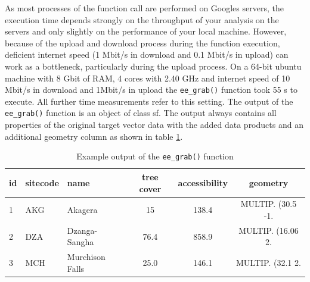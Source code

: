 As most processes of the function call are performed on Googles servers, the execution time depends strongly on the throughput of your analysis on the servers and only slightly on the performance of your local machine. However, because of the upload and download process during the function execution, deficient internet speed (1 Mbit/s in download and 0.1 Mbit/s in upload) can work as a bottleneck, particularly during the upload process. 
On a 64-bit ubuntu machine with 8 Gbit of RAM, 4 cores with 2.40 GHz and internet speed of 10 Mbit/s in download and 1Mbit/s in upload the \texttt{ee\_grab()} function took 55 s to execute. All further time measurements refer to this setting.
The output of the \texttt{ee\_grab()} function is an object of class sf.  The output always contains all properties of the original target vector data with the added data products and an additional geometry column as shown in table \ref{output}.

\begin{table}[h]
	\begin{tabularx}{\textwidth}{|l|l|l|c|c|c|}
		\hline
		id & sitecode & name & tree cover & accessibility & geometry \\
		\hline
		1  & AKG  & Akagera & 15 & 138.4 & MULTIP. (30.5 -1.\\
		2 & DZA  & Dzanga-Sangha & 76.4 & 858.9 & MULTIP. (16.06 2.\\
		3 & MCH  & Murchison Falls & 25.0 & 146.1 & MULTIP. (32.1 2.\\
		
		\hline
	\end{tabularx}
	\caption{Example output of the \texttt{ee\_grab()} function}
	\label{output}
\end{table}


